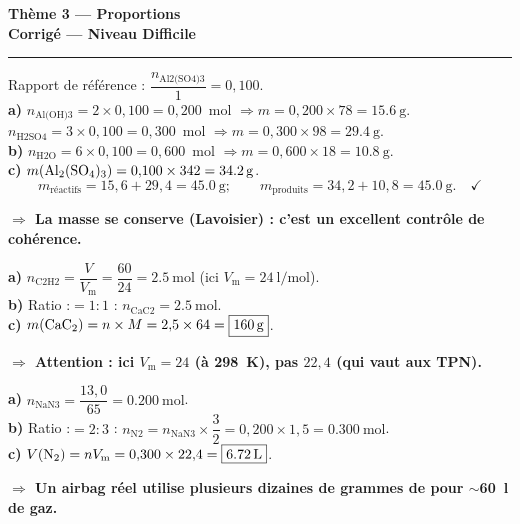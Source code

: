 \documentclass[11pt,a4paper]{article}
\newcommand{\nq}[1]{n_{\text{#1}}}
\newcommand{\Vm}{V_{\mathrm m}}
\newcommand{\rep}[1]{\par\smallskip\noindent\textbf{\color{corrcol}$\Rightarrow$ #1}}
\begin{document}
\begin{center}
{\LARGE\bfseries\color{primarydark}Thème 3 — Proportions}\\[1pt]
{\large\color{corrcol}\textbf{Corrigé — Niveau Difficile}}\\
{\color{primary}\rule{0.6\linewidth}{1pt}}
\end{center}

\begin{cor}
Rapport de référence : $\dfrac{\nq{Al2(SO4)3}}{1}=0{,}100$.\\
\textbf{a)} $\nq{Al(OH)3}=2\times0{,}100=0{,}200$~mol $\Rightarrow m=0{,}200\times78=\boxed{\SI{15,6}{\gram}}$.\\
\phantom{a)} $\nq{H2SO4}=3\times0{,}100=0{,}300$~mol $\Rightarrow m=0{,}300\times98=\boxed{\SI{29,4}{\gram}}$.\\
\textbf{b)} $\nq{H2O}=6\times0{,}100=0{,}600$~mol $\Rightarrow m=0{,}600\times18=\boxed{\SI{10,8}{\gram}}$.\\
\textbf{c)} $m(\ce{Al2(SO4)3})=0{,}100\times342=\SI{34,2}{\gram}$.
\[
m_{\text{réactifs}}=15{,}6+29{,}4=\SI{45,0}{\gram};\qquad m_{\text{produits}}=34{,}2+10{,}8=\SI{45,0}{\gram}. \quad\checkmark
\]
\rep{La masse se conserve (Lavoisier) : c'est un excellent contrôle de cohérence.}
\end{cor}

\begin{cor}
\textbf{a)} $\nq{C2H2}=\dfrac{V}{\Vm}=\dfrac{60}{24}=\SI{2,5}{\mole}$ (ici $\Vm=\SI{24}{\litre\per\mole}$).\\
\textbf{b)} Ratio :$=1:1$ : $\nq{CaC2}=\SI{2,5}{\mole}$.\\
\textbf{c)} $m(\ce{CaC2})=n\times M = 2{,}5\times64=\boxed{\SI{160}{\gram}}$.
\rep{Attention : ici $\Vm=24$ (à \SI{298}{\kelvin}), pas $22{,}4$ (qui vaut aux TPN).}
\end{cor}

\begin{cor}
\textbf{a)} $\nq{NaN3}=\dfrac{13{,}0}{65}=\SI{0,200}{\mole}$.\\
\textbf{b)} Ratio :$=2:3$ : $\nq{N2}=\nq{NaN3}\times\dfrac{3}{2}=0{,}200\times1{,}5=\SI{0,300}{\mole}$.\\
\textbf{c)} $V(\ce{N2})=n\Vm=0{,}300\times22{,}4=\boxed{\SI{6,72}{\litre}}$.
\rep{Un airbag réel utilise plusieurs dizaines de grammes de \ce{NaN3} pour \(\sim\)\SI{60}{\litre} de gaz.}
\end{cor}
\end{document}
